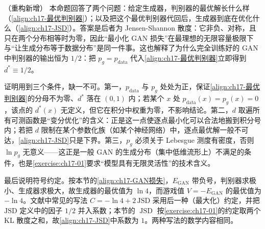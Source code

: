 \documentclass[../../main.tex]{subfiles}
\begin{document}
\begin{remark}（重构新增）
本命题回答了两个问题：给定生成器，判别器的最优解长什么样（\eqref{align:ch17-最优判别器}）；以及把这个最优判别器代回后，生成器到底在优化什么（\eqref{align:ch17-JSD}）。答案是后者为 Jensen-Shannon 散度：它非负、对称，且只在两个分布相等时为零，因此“最小化 GAN 损失”在最理想的无限容量极限下与“让生成分布等于数据分布”是同一件事。这也解释了为什么完全训练好的 GAN 中判别器的输出恒为 $1/2$：把 $p_g=p_{\mathrm{data}}$ 代入\eqref{align:ch17-最优判别器}立即得到 $d^*\equiv1/2$。

证明用到三个条件，缺一不可。第一，$p_{\mathrm{data}}$ 与 $p_g$ 处处为正，保证\eqref{align:ch17-最优判别器}的分母不为零、$d^*$ 落在 $(0,1)$ 内；若某个 $x$ 处 $p_{\mathrm{data}}(x)=p_g(x)=0$，该点的 $d^*(x)$ 无定义，但它在积分中权重为零，不影响结论。第二，$d$ 取遍所有可测函数是“变分优化”的含义：正是这一点使逐点最小化可以合法地搬到积分号内；若把 $d$ 限制在某个参数化族（如某个神经网络）中，逐点最优解一般不可达，\eqref{align:ch17-JSD}只是下界。第三，$p_g$ 必须关于 Lebesgue 测度有密度，否则 $\ln p_g$ 无意义——这正是一般 GAN 的生成分布（集中低维流形上）不满足的条件，也是\cref{exercise:ch17-01}要求“模型具有无限灵活性”的技术含义。

最后说明符号约定。按本节的\eqref{align:ch17-GAN损失}，$E_{\mathrm{GAN}}$ 带负号，判别器求极小、生成器求极大，故生成器的最优值为 $\ln4$，而游戏值 $V=-E_{\mathrm{GAN}}$ 的最优值为 $-\ln4$。文献中常见的写法 $C=-\ln4+2\,\mathrm{JSD}$ 采用后一种（最大化）约定，并把 $\mathrm{JSD}$ 定义中的因子 $1/2$ 并入系数；本节的 $\operatorname{JSD}$ 按\cref{exercise:ch17-01}的约定取两个 KL 散度之和，故\eqref{align:ch17-JSD}中系数为 $1$。两种写法的数学内容相同。
\end{remark}
\end{document}
